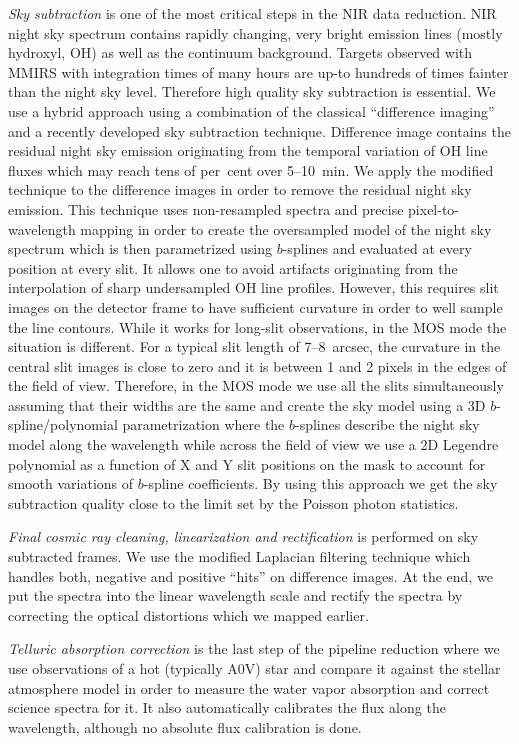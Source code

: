  \emph{Sky subtraction} is one of the most critical steps in the NIR data reduction.  NIR night sky spectrum contains rapidly changing, very bright emission lines (mostly hydroxyl, OH) as well as the continuum background. Targets observed with MMIRS with integration times of many hours are up-to hundreds of times fainter than the night sky level.  Therefore high quality sky subtraction is essential.  We use a hybrid approach using a combination of the classical ``difference imaging'' and a recently developed sky subtraction technique.  Difference image contains the residual night sky emission originating from the temporal variation of OH line fluxes which may reach tens of per~cent over 5--10~min.  We apply the modified \citet{Kelson03} technique to the difference images in order to remove the residual night sky emission.  This technique uses non-resampled spectra and precise pixel-to-wavelength mapping in order to create the oversampled model of the night sky spectrum which is then parametrized using $b$-splines and evaluated at every position at every slit.  It allows one to avoid artifacts originating from the interpolation of sharp undersampled OH line profiles. However, this requires slit images on the detector frame to have sufficient curvature in order to well sample the line contours.  While it works for long-slit observations, in the MOS mode the situation is different.  For a typical slit length of 7--8~arcsec, the curvature in the central slit images is close to zero and it is between 1 and 2 pixels in the edges of the field of view.  Therefore, in the MOS mode we use all the slits simultaneously assuming that their widths are the same and create the sky model using a 3D $b$-spline/polynomial parametrization where the $b$-splines describe the night sky model along the wavelength while across the field of view we use a 2D Legendre polynomial as a function of X and Y slit positions on the mask to account for smooth variations of $b$-spline coefficients.  By using this approach we get the sky subtraction quality close to the limit set by the Poisson photon statistics.

\emph{Final cosmic ray cleaning, linearization and rectification} is performed on sky subtracted frames.  We use the modified Laplacian filtering technique \citep{vanDokkum01} which handles both, negative and positive ``hits'' on difference images.  At the end, we put the spectra into the linear wavelength scale and rectify the spectra by correcting the optical distortions which we mapped earlier.

\emph{Telluric absorption correction} is the last step of the pipeline reduction where we use observations of a hot (typically A0V) star and compare it against the stellar atmosphere model in order to measure the water vapor absorption and correct science spectra for it. It also automatically calibrates the flux along the wavelength, although no absolute flux calibration is done.

